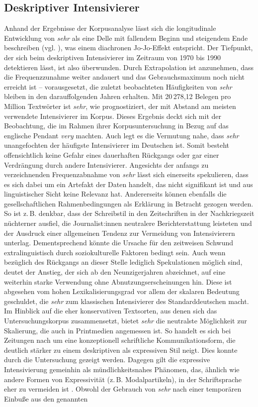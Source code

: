\subsection{Deskriptiver Intensivierer}

Anhand der Ergebnisse der Korpusanalyse lässt sich die longitudinale Entwicklung von \textit{sehr} als eine Delle mit fallendem Beginn und steigendem Ende beschreiben (vgl. ), was einem diachronen Jo-Jo-Effekt entspricht. Der Tiefpunkt, der sich beim deskriptiven Intensivierer im Zeitraum von 1970 bis 1990 detektieren lässt, ist also überwunden. Durch Extrapolation ist anzunehmen, dass die Frequenzzunahme weiter andauert und das Gebrauchsmaximum noch nicht erreicht ist -- vorausgesetzt, die zuletzt beobachteten Häufigkeiten von \textit{sehr} bleiben in den darauffolgenden Jahren erhalten. Mit 20\,278,12 Belegen pro Million Textwörter ist \textit{sehr}, wie prognostiziert, der mit Abstand am meisten verwendete Intensivierer im Korpus. Dieses Ergebnis deckt sich mit der Beobachtung, die \citet[266]{Ito.2003} im Rahmen ihrer Korpusuntersuchung in Bezug auf das englische Pendant \textit{very} machten. Auch legt es die Vermutung nahe, dass \textit{sehr} unangefochten der häufigste Intensivierer im Deutschen ist. Somit besteht offensichtlich keine Gefahr eines dauerhaften Rückgangs oder gar einer Verdrängung durch andere Intensivierer. Angesichts der anfangs zu verzeichnenden Frequenzabnahme von \textit{sehr} lässt sich einerseits spekulieren, dass es sich dabei um ein Artefakt der Daten handelt, das nicht signifikant ist und aus linguistischer Sicht keine Relevanz hat. Andererseits können ebenfalls die gesellschaftlichen Rahmenbedingungen als Erklärung in Betracht gezogen werden. So ist z.\,B. denkbar, dass der Schreibstil in den Zeitschriften in der Nachkriegszeit nüchterner ausfiel, die Journalist:innen neutralere Berichterstattung leisteten und der Ausdruck einer allgemeinen Tendenz zur Vermeidung von Intensivierern unterlag. Dementsprechend könnte die Ursache für den zeitweisen Schwund extralinguistisch durch soziokulturelle Faktoren bedingt sein. Auch wenn bezüglich des Rückgangs an dieser Stelle lediglich Spekulationen möglich sind, deutet der Anstieg, der sich ab den Neunzigerjahren abzeichnet, auf eine weiterhin starke Verwendung ohne Abnutzungserscheinungen hin. Diese ist abgesehen vom hohen Lexikalisierungsgrad vor allem der skalaren Bedeutung geschuldet, die \textit{sehr} zum klassischen Intensivierer des Standarddeutschen macht. Im Hinblick auf die eher konservativen Textsorten, aus denen sich das Untersuchungskorpus zusammensetzt, bietet \textit{sehr} die neutralste Möglichkeit zur Skalierung, die auch in Printmedien angemessen ist. So handelt es sich bei Zeitungen nach \citet[]{Koch.1996,Koch.2007} um eine konzeptionell schriftliche Kommunikationsform, die deutlich stärker zu einem deskriptiven als expressiven Stil neigt. Dies konnte durch die Untersuchung gezeigt werden. Dagegen gilt die expressive Intensivierung gemeinhin als mündlichkeitsnahes Phänomen, das, ähnlich wie andere Formen von Expressivität (z.\,B. Modalpartikeln), in der Schriftsprache eher zu vermeiden ist \citep[vgl.][9]{Weydt.1969}. Obwohl der Gebrauch von \textit{sehr} nach einer temporären Einbuße aus den genannten 